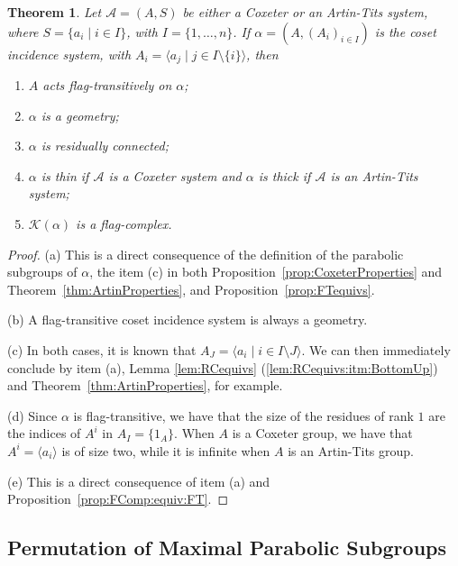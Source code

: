 \documentclass[11pt,letterpaper]{amsart}
\newtheorem{thm}[prop]{Theorem}
\newcommand{\KK}{\mathcal{K}}
\begin{document}
\begin{thm}\label{thm:Artin_Coxeter_CG}
    Let $\mathcal{A}=(A,S)$ be either a Coxeter or an Artin-Tits system, where $S=\{a_i\mid i\in I\}$, with $I=\{1,\ldots,n\}$.
    If $\alpha=(A,(A_i)_{i\in I})$ is the coset incidence system, with $A_i=\langle a_j \mid j\in I\setminus\{i\}\rangle$, then
    \begin{enumerate}
        \item $A$ acts flag-transitively on $\alpha$;
        \item $\alpha$ is a geometry;
        \item $\alpha$ is residually connected;
        \item $\alpha$ is thin if $\mathcal{A}$ is a Coxeter system and $\alpha$ is thick if $\mathcal{A}$ is an Artin-Tits system;
        \item $\KK(\alpha)$ is a flag-complex.
    \end{enumerate}

\end{thm}
\begin{proof}
    (a) This is a direct consequence of the definition of the parabolic subgroups of $\alpha$, the item (c) in both Proposition~\ref{prop:CoxeterProperties} and Theorem~\ref{thm:ArtinProperties}, and Proposition~\ref{prop:FTequivs}.
    
    (b) A flag-transitive coset incidence system is always a geometry.
    
    (c) In both cases, it is known that $A_J = \langle a_i \mid i \in I \setminus J \rangle$. We can then immediately conclude by item (a), Lemma \ref{lem:RCequivs} (\ref{lem:RCequivs:itm:BottomUp}) and Theorem~\ref{thm:ArtinProperties}, for example.
    
    (d) Since $\alpha$ is flag-transitive, we have that the size of the residues of rank $1$ are the indices of $A^i$ in $A_I = \{1_A\}$. When $A$ is a Coxeter group, we have that $A^i = \langle a_i \rangle$ is of size two, while it is infinite when $A$ is an Artin-Tits group.

    (e) This is a direct consequence of item (a) and Proposition~\ref{prop:FComp:equiv:FT}.
\end{proof}




\subsection{Permutation of Maximal Parabolic Subgroups}\label{sec:pre:subsec:PermMaxPara}
\end{document}
